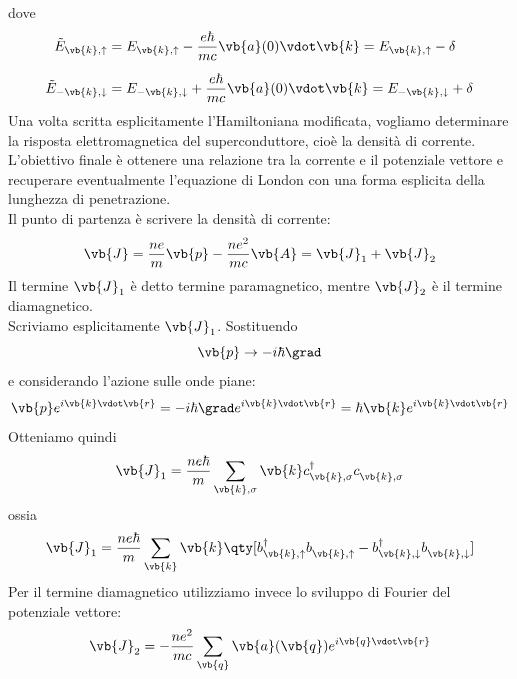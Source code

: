dove
\begin{equation*}
   \begin{split}
      \tilde{E}_{\vb{k},\uparrow}
      &=
      E_{\vb{k},\uparrow}
      -
      \frac{e\hbar}{mc}
      \vb{a}(0)\vdot\vb{k}
      =
      E_{\vb{k},\uparrow}
      -
      \delta
      \\[0.2cm]
      \tilde{E}_{-\vb{k},\downarrow}
      &=
      E_{-\vb{k},\downarrow}
      +
      \frac{e\hbar}{mc}
      \vb{a}(0)\vdot\vb{k}
      =
      E_{-\vb{k},\downarrow}
      +
      \delta
   \end{split}
\end{equation*}
Una volta scritta esplicitamente l'Hamiltoniana modificata, vogliamo determinare la risposta elettromagnetica del superconduttore, cioè la densità di corrente. L'obiettivo finale è ottenere una relazione tra la corrente e il potenziale vettore e recuperare eventualmente l'equazione di London con una forma esplicita della lunghezza di penetrazione.\\
Il punto di partenza è scrivere la densità di corrente:
\begin{equation*}
   \vb{J}
   =
   \frac{ne}{m}\vb{p}
   -
   \frac{ne^2}{mc}\vb{A}
   =
   \vb{J}_1+\vb{J}_2
\end{equation*}
Il termine $\vb{J}_1$ è detto termine paramagnetico, mentre $\vb{J}_2$ è il termine diamagnetico.\\
Scriviamo esplicitamente $\vb{J}_1$. Sostituendo
\[
\vb{p}\to -i\hbar\grad
\]
e considerando l'azione sulle onde piane:
\begin{equation*}
   \vb{p}
   e^{i\vb{k}\vdot\vb{r}}
   =
   -i\hbar
   \grad
   e^{i\vb{k}\vdot\vb{r}}
   =
   \hbar\vb{k}
   e^{i\vb{k}\vdot\vb{r}}
\end{equation*}
Otteniamo quindi
\begin{equation*}
   \vb{J}_1
   =
   \frac{ne\hbar}{m}
   \sum_{\vb{k},\sigma}
   \vb{k}
   c^{\dag}_{\vb{k},\sigma}
   c^{\vphantom{\dag}}_{\vb{k},\sigma}
\end{equation*}
ossia
\begin{equation*}
   \vb{J}_1
   =
   \frac{ne\hbar}{m}
   \sum_{\vb{k}}
   \vb{k}
   \qty[
      b^{\dag}_{\vb{k},\uparrow}
      b^{\vphantom{\dag}}_{\vb{k},\uparrow}
      -
      b^{\dag}_{\vb{k},\downarrow}
      b^{\vphantom{\dag}}_{\vb{k},\downarrow}
   ]
\end{equation*}
Per il termine diamagnetico utilizziamo invece lo sviluppo di Fourier del potenziale vettore:
\begin{equation*}
   \vb{J}_2
   =
   -
   \frac{ne^2}{mc}
   \sum_{\vb{q}}
   \vb{a}(\vb{q})
   e^{i\vb{q}\vdot\vb{r}}
\end{equation*}
